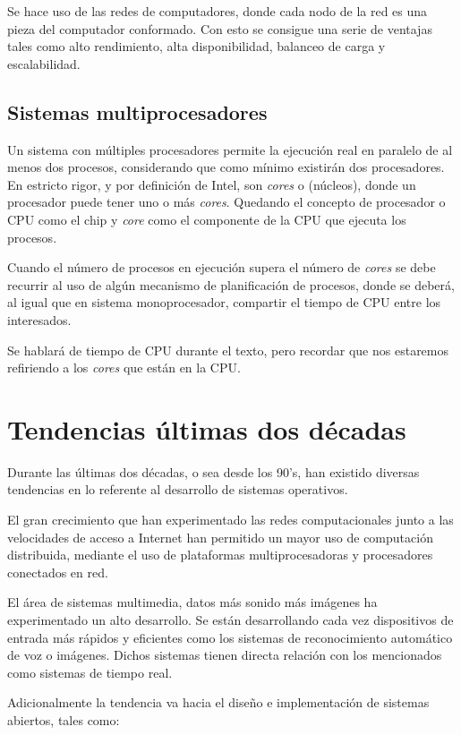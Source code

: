 Se hace uso de las redes de computadores, donde cada nodo de la red es una pieza
del computador conformado. Con esto se consigue una serie de ventajas tales como
alto rendimiento, alta disponibilidad, balanceo de carga y escalabilidad.

\subsection{Sistemas multiprocesadores}
Un sistema con múltiples procesadores permite la ejecución real en paralelo de
al menos dos procesos, considerando que como mínimo existirán dos procesadores.
En estricto rigor, y por definición de Intel, son \textit{cores} o (núcleos),
donde un procesador puede tener uno o más \textit{cores}. Quedando el concepto
de procesador o CPU como el chip y \textit{core} como el componente de la CPU
que ejecuta los procesos.

Cuando el número de procesos en ejecución supera el número de \textit{cores} se
debe recurrir al uso de algún mecanismo de planificación de procesos, donde se
deberá, al igual que en sistema monoprocesador, compartir el tiempo de CPU entre
los interesados.

Se hablará de tiempo de CPU durante el texto, pero recordar que nos estaremos
refiriendo a los \textit{cores} que están en la CPU.

\section{Tendencias últimas dos décadas}

Durante las últimas dos décadas, o sea desde los 90's, han existido diversas
tendencias en lo referente al desarrollo de sistemas operativos.

El gran crecimiento que han experimentado las redes computacionales junto a las
velocidades de acceso a Internet han permitido un mayor uso de computación
distribuida, mediante el uso de plataformas multiprocesadoras y procesadores
conectados en red.

El área de sistemas multimedia, datos más sonido más imágenes ha experimentado
un alto desarrollo. Se están desarrollando cada vez dispositivos de entrada más
rápidos y eficientes como los sistemas de reconocimiento automático de voz o
imágenes. Dichos sistemas tienen directa relación con los mencionados como
sistemas de tiempo real.

Adicionalmente la tendencia va hacia el diseño e implementación de sistemas
abiertos, tales como:

